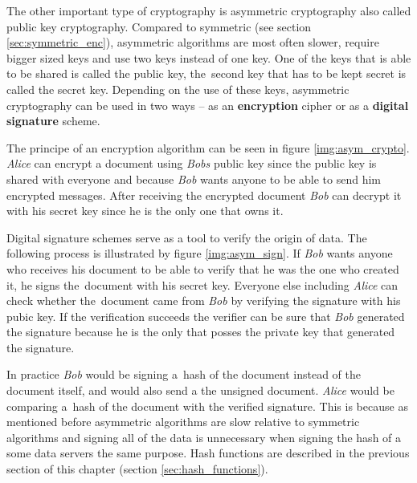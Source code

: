 The other important type of cryptography is asymmetric cryptography also called public key cryptography. Compared to symmetric (see section \ref{sec:symmetric_enc}), asymmetric algorithms are most often slower, require bigger sized keys and use two keys instead of one key. One of the keys that is able to be shared is called the public key, the~second key that has to be kept secret is called the secret key. Depending on the use of these keys, asymmetric cryptography can be used in two ways -- as an \textbf{encryption} cipher or as a \textbf{digital signature} scheme.

The principe of an encryption algorithm can be seen in figure \ref{img:asym_crypto}. \textit{Alice} can encrypt a document using \textit{Bobs} public key since the public key is shared with everyone and because \textit{Bob} wants anyone to be able to send him encrypted messages. After receiving the encrypted document \textit{Bob} can decrypt it with his secret key since he is the only one that owns it. \cite{Smart2004}


Digital signature schemes serve as a tool to verify the origin of data. The following process is illustrated by figure \ref{img:asym_sign}. If \textit{Bob} wants anyone who receives his document to be able to verify that he was the one who created it, he signs the~document with his secret key. Everyone else including \textit{Alice} can check whether the~document came from \textit{Bob} by verifying the signature with his pubic key. If the verification succeeds the verifier can be sure that \textit{Bob} generated the signature because he is the only that posses the private key that generated the signature. \cite{Paar2010}

In practice \textit{Bob} would be signing a~hash of the document instead of the document itself, and would also send a the unsigned document. \textit{Alice} would be comparing a~hash of the document with the verified signature. This is because as mentioned before asymmetric algorithms are slow relative to symmetric algorithms and signing all of the data is unnecessary when signing the hash of a some data servers the same purpose. Hash functions are described in the previous section of this chapter (section \ref{sec:hash_functions}).

